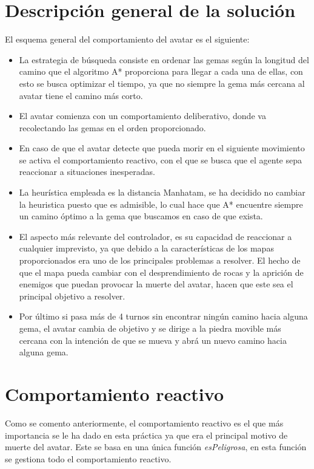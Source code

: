 \documentclass[size=a4, parskip=half, titlepage=false, toc=flat, toc=bib, 12pt]{scrartcl}
\begin{document}
\section{Descripción general de la solución}
El esquema general del comportamiento del avatar es el siguiente:
\begin{itemize}
\item La estrategia de búsqueda consiste en ordenar las gemas según la longitud del camino que el algoritmo A*
proporciona para llegar a cada una de ellas, con esto se busca optimizar el
tiempo, ya que no siempre la gema más cercana al avatar tiene el camino más corto.

\item El avatar comienza con un comportamiento deliberativo, donde va recolectando
las gemas en el orden proporcionado.

\item En caso de que el avatar detecte que pueda morir en el siguiente movimiento
se activa el comportamiento reactivo, con el que se busca que el agente
sepa reaccionar a situaciones inesperadas.

\item La heurística empleada es la distancia Manhatam, se ha decidido no cambiar
la heuristica puesto que es admisible, lo cual hace que A*
 encuentre siempre un camino óptimo a la gema que buscamos en caso de que exista.

\item El aspecto más relevante del controlador, es su capacidad de reaccionar
a cualquier imprevisto, ya que debido a la características de los mapas
proporcionados era uno de los principales problemas a resolver. El hecho de que
el mapa pueda cambiar con el desprendimiento de rocas y la aprición de enemigos
que puedan provocar la muerte del avatar, hacen que este sea el principal objetivo
a resolver.

\item Por último si pasa más de 4 turnos sin encontrar ningún camino hacia alguna
gema, el avatar cambia de objetivo y se dirige a la piedra movible más cercana con
la intención de que se mueva y abrá un nuevo camino hacia alguna gema.
\end{itemize}

\newpage

\section{Comportamiento reactivo}
Como se comento anteriormente, el comportamiento reactivo es el que más importancia
se le ha dado en esta práctica ya que era el principal motivo de muerte del avatar.
Este se basa en una única función \textit{esPeligrosa}, en esta función se gestiona
todo el comportamiento reactivo.
\end{document}
